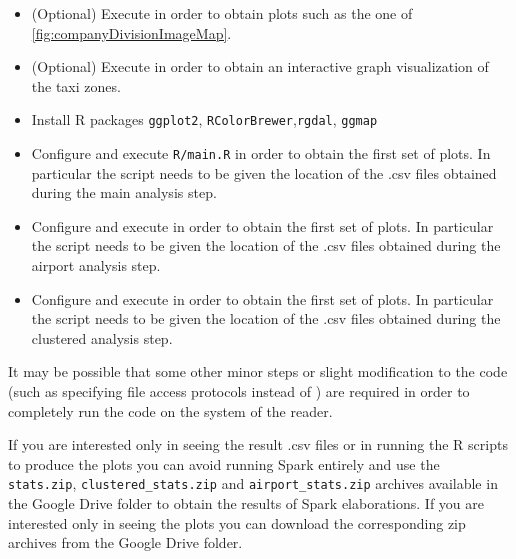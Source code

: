 \documentclass{acm_proc_article-sp-sigmod09}
\begin{document}
\begin{itemize}
	\item (Optional) Execute  in order to obtain plots such as the one of \cref{fig:companyDivisionImageMap}.
	\item (Optional) Execute  in order to obtain an interactive graph visualization of the taxi zones.
	\item Install R packages \texttt{ggplot2}, \texttt{RColorBrewer},\texttt{rgdal}, \texttt{ggmap}
	\item Configure and execute \texttt{R/main.R} in order to obtain the first set of plots. In particular the script needs to be given the location of the .csv files obtained during the main analysis step.
	\item Configure and execute  in order to obtain the first set of plots. In particular the script needs to be given the location of the .csv files obtained during the airport analysis step.
	\item Configure and execute  in order to obtain the first set of plots. In particular the script needs to be given the location of the .csv files obtained during the clustered analysis step.
\end{itemize}

It may be possible that some other minor steps or slight modification to the code (such as specifying file access protocols  instead of ) are required in order to completely run the code on the system of the reader.

If you are interested only in seeing the result .csv files or in running the R scripts to produce the plots you can avoid running Spark entirely and use the \texttt{stats.zip}, \texttt{clustered\_stats.zip} and \texttt{airport\_stats.zip} archives available in the Google Drive folder to obtain the results of Spark elaborations. If you are interested only in seeing the plots you can download the corresponding zip archives from the Google Drive folder.
\end{document}
